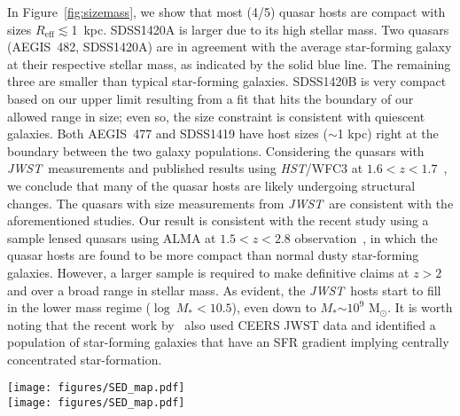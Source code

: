 \documentclass[twocolumn,]{aastex631}
\newcommand{\reff}{{$R_{\mathrm{eff}}$}}
\newcommand{\smass}{{$M_*$}}
\newcommand{\hst}{{\it HST}}
\newcommand{\jwst}{{\it JWST}}
\begin{document}
In Figure~\ref{fig:sizemass}, we show that most (4/5) quasar hosts are compact with sizes \reff$\lesssim$1~kpc. SDSS1420A is larger due to its high stellar mass. Two quasars (AEGIS~482, SDSS1420A) are in agreement with the average star-forming galaxy at their respective stellar mass, as indicated by the solid blue line. The remaining three are smaller than typical star-forming galaxies. SDSS1420B is very compact based on our upper limit resulting from a fit that hits the boundary of our allowed range in size; even so, the size constraint is consistent with quiescent galaxies. Both AEGIS~477 and SDSS1419 have host sizes ($\sim$1 kpc) right at the boundary between the two galaxy populations. Considering the quasars with \jwst\ measurements and published results using \hst/WFC3 at $1.6<z<1.7$~\citep{Ding2020}, we conclude that many of the quasar hosts are likely undergoing structural changes. The quasars with size measurements from \jwst\ are consistent with the aforementioned studies. 
Our result is consistent with the recent study using a sample lensed quasars using ALMA at $1.5<z<2.8$ observation~\citep{Stacey2021}, in which the quasar hosts are found to be more compact than normal dusty star-forming galaxies.
However, a larger sample is required to make definitive claims at $z>2$ and over a broad range in stellar mass. As evident, the \jwst\ hosts start to fill in the lower mass regime ($\log~M_*<10.5$), even down to \smass$\sim10^9$ M$_{\odot}$.    
It is worth noting that the recent work by~\citet{Miller2022} also used CEERS JWST data and identified a population of star-forming galaxies that have an SFR gradient implying centrally concentrated star-formation.

\begin{figure*}
\centering
\texttt{[image: figures/SED\_map.pdf]}\\
\texttt{[image: figures/SED\_map.pdf]}
\caption{Spatially-resolved host properties of SDSS1420A. The top panels are ($Left$) the original quasar color image from combining three \jwst\ filters as indicated, ($Right$) the color image of the host galaxy after the central quasar is subtracted in each filter. The bottom panels from left to right are (1) the stellar mass map. (2) SFR map, and (3) age map. In various panels, three regions are indicated with a radius of 2~kpc, 4~kpc, and 8~kpc. The 2~kpc region is applied as a mask in the bottom panels.}
\label{fig:sedmap}
\end{figure*}
\end{document}
